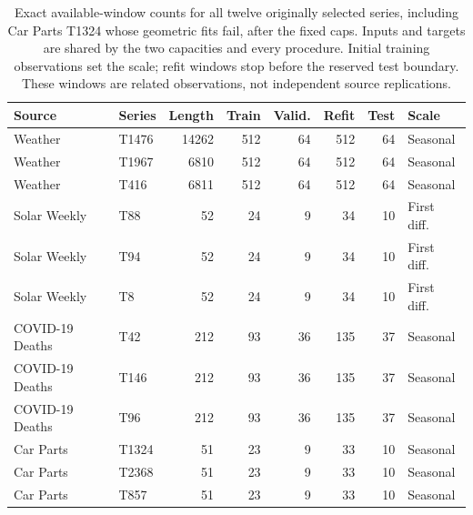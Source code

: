 \begin{table}[!htbp]
\centering\small\setlength{\tabcolsep}{4pt}
\caption{Exact available-window counts for all twelve originally selected series, including Car Parts T1324 whose geometric fits fail, after the fixed caps. Inputs and targets are shared by the two capacities and every procedure. Initial training observations set the scale; refit windows stop before the reserved test boundary. These windows are related observations, not independent source replications.}
\label{tab:utility-windows}
\begin{tabular}{llrrrrrl}
\toprule
Source & Series & Length & Train & Valid. & Refit & Test & Scale \\
\midrule
Weather & T1476 & 14262 & 512 & 64 & 512 & 64 & Seasonal \\
Weather & T1967 & 6810 & 512 & 64 & 512 & 64 & Seasonal \\
Weather & T416 & 6811 & 512 & 64 & 512 & 64 & Seasonal \\
Solar Weekly & T88 & 52 & 24 & 9 & 34 & 10 & First diff. \\
Solar Weekly & T94 & 52 & 24 & 9 & 34 & 10 & First diff. \\
Solar Weekly & T8 & 52 & 24 & 9 & 34 & 10 & First diff. \\
COVID-19 Deaths & T42 & 212 & 93 & 36 & 135 & 37 & Seasonal \\
COVID-19 Deaths & T146 & 212 & 93 & 36 & 135 & 37 & Seasonal \\
COVID-19 Deaths & T96 & 212 & 93 & 36 & 135 & 37 & Seasonal \\
Car Parts & T1324 & 51 & 23 & 9 & 33 & 10 & Seasonal \\
Car Parts & T2368 & 51 & 23 & 9 & 33 & 10 & Seasonal \\
Car Parts & T857 & 51 & 23 & 9 & 33 & 10 & Seasonal \\
\bottomrule
\end{tabular}
\end{table}
